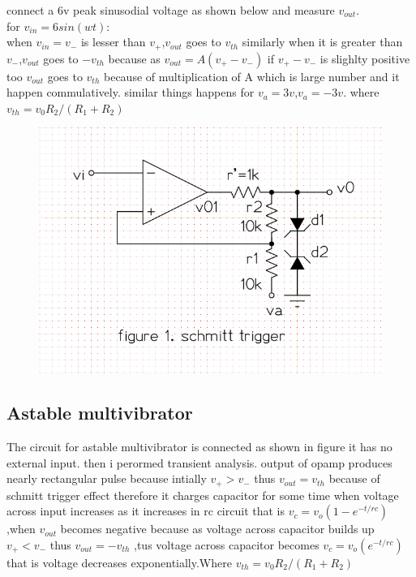 \documentclass[12pt]{article}
\begin{document}
connect a 6v peak sinusodial voltage as shown below and measure \(v_{out}\).\\
for \(v_{in}=6sin(wt)\):\\
when \(v_{in}=v_{-}\) is lesser than \(v_{+}\),\(v_{out}\) goes to \(v_{th}\) similarly when it is greater than \(v_{-}\),\(v_{out}\) goes to \(-v_{th}\) because as \(v_{out}=A(v_{+}-v_{-})\) if \(v_{+}-v_{-}\) is slighlty positive too \(v_{out}\) goes to \(v_{th}\) because of multiplication of A which is large number and it happen commulatively. similar things happens for \(v_{a}=3v\),\(v_{a}=-3v\). where \(v_{th}=v_{0}R_{2}/(R_{1}+R_{2})\)\\
 \begin{figure}[h!]
\centering
\includegraphics[scale = 0.6]{schmitt_trigger.png}
\end{figure}
\newpage

 
\subsection{Astable multivibrator}
The circuit for astable multivibrator is connected as shown in figure it has no external input.
then i perormed transient analysis. output of opamp produces nearly rectangular pulse because intially \(v_{+}>v_{-}\) thus \(v_{out}=v_{th}\) because of schmitt trigger effect therefore it charges capacitor for some time when voltage across input increases as it increases in rc circuit that is \(v_{c}=v_{o}(1-e^{-t/rc})\) ,when \(v_{out}\) becomes negative because as voltage across capacitor builds up  \(v_{+}<v_{-}\) thus \(v_{out}=-v_{th}\) ,tus voltage across capacitor becomes \(v_{c}=v_{o}(e^{-t/rc})\) that is voltage decreases exponentially.Where \(v_{th}=v_{0}R_{2}/(R_{1}+R_{2})\) \\
\end{document}
